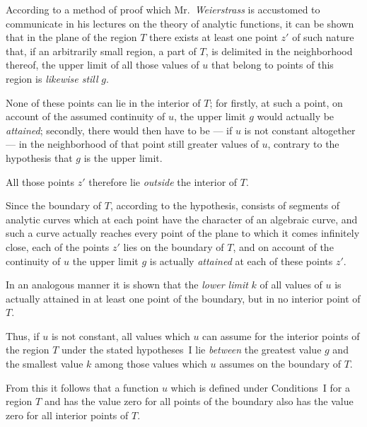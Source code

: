 \documentclass{article}
\begin{document}
According to a method of proof which Mr.~\emph{Weierstrass} is accustomed to communicate in his lectures on the theory of analytic functions, it can be shown that in the plane of the region $T$ there exists at least one point $z'$ of such nature that, if an arbitrarily small region, a part of $T$, is delimited in the neighborhood thereof, the upper limit of all those values of $u$ that belong to points of this region is \emph{likewise still} $g$.



None of these points can lie in the interior of $T$; for firstly, at such a point, on account of the assumed continuity of $u$, the upper limit $g$ would actually be \emph{attained}; secondly, there would then have to be --- if $u$ is not constant altogether --- in the neighborhood of that point still greater values of $u$, contrary to the hypothesis that $g$ is the upper limit.



All those points $z'$ therefore lie \emph{outside} the interior of $T$.



Since the boundary of $T$, according to the hypothesis, consists of segments of analytic curves which at each point have the character of an algebraic curve, and such a curve actually reaches every point of the plane to which it comes infinitely close, each of the points $z'$ lies on the boundary of $T$, and on account of the continuity of $u$ the upper limit $g$ is actually \emph{attained} at each of these points $z'$.



In an analogous manner it is shown that the \emph{lower limit} $k$ of all values of $u$ is actually attained in at least one point of the boundary, but in no interior point of $T$.



Thus, if $u$ is not constant, all values which $u$ can assume for the interior points of the region $T$ under the stated hypotheses~I lie \emph{between} the greatest value $g$ and the smallest value $k$ among those values which $u$ assumes on the boundary of $T$.




From this it follows that a function $u$ which is defined under Conditions~I for a region $T$ and has the value zero for all points of the boundary also has the value zero for all interior points of $T$.
\end{document}
